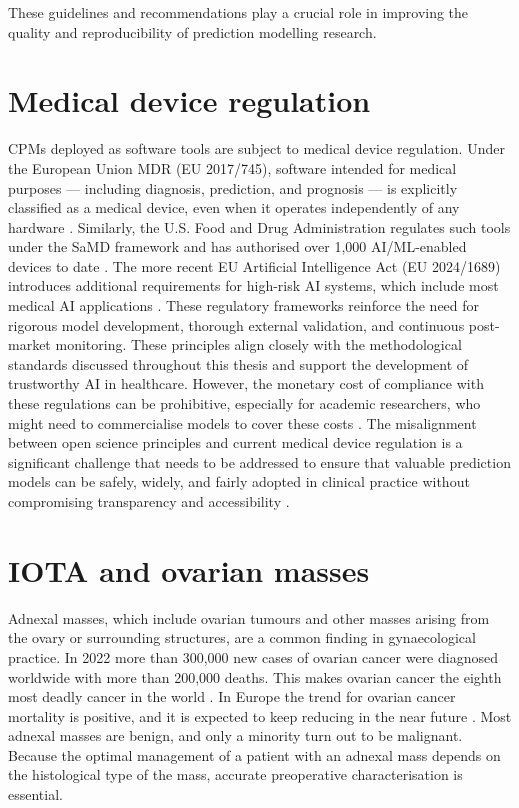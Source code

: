 These guidelines and recommendations play a crucial role in improving the quality and reproducibility of prediction modelling research.


\section{Medical device regulation}

\Glspl{CPM} deployed as software tools are subject to medical device regulation. Under the European Union \gls{MDR} (EU 2017/745), software intended for medical purposes --- including diagnosis, prediction, and prognosis --- is explicitly classified as a medical device, even when it operates independently of any hardware \cite{EUMDR2017}. Similarly, the U.S. Food and Drug Administration regulates such tools under the \gls{SaMD} framework and has authorised over 1,000 AI/ML-enabled devices to date \cite{FDA_AIML_SaMD_2021}. The more recent EU Artificial Intelligence Act (EU 2024/1689) introduces additional requirements for high-risk AI systems, which include most medical AI applications \cite{EUAIAct2024}. These regulatory frameworks reinforce the need for rigorous model development, thorough external validation, and continuous post-market monitoring. These principles align closely with the methodological standards discussed throughout this thesis and support the development of trustworthy AI in healthcare. However, the monetary cost of compliance with these regulations can be prohibitive, especially for academic researchers, who might need to commercialise models to cover these costs \cite{kotlarzImpactMedicalDevice2025}. The misalignment between open science principles and current medical device regulation is a significant challenge that needs to be addressed to ensure that valuable prediction models can be safely, widely, and fairly adopted in clinical practice without compromising transparency and accessibility \cite{van2026enemies}.

\section{IOTA and ovarian masses}

Adnexal masses, which include ovarian tumours and other masses arising from the ovary or surrounding structures, are a common finding in gynaecological practice. In 2022 more than 300,000 new cases of ovarian cancer were diagnosed worldwide with more than 200,000 deaths. This makes ovarian cancer the eighth most deadly cancer in the world \cite{brayGlobalCancerStatistics2024}. In Europe the trend for ovarian cancer mortality is positive, and it is expected to keep reducing in the near future \cite{wojtylaEuropeanTrendsOvarian2023}. Most adnexal masses are benign, and only a minority turn out to be malignant. Because the optimal management of a patient with an adnexal mass depends on the histological type of the mass, accurate preoperative characterisation is essential.

